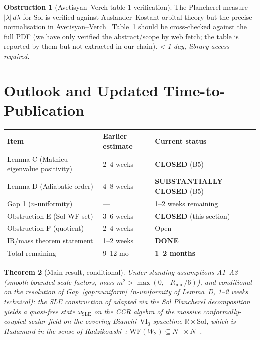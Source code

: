 \documentclass[11pt,a4paper]{article}
\newtheorem{theorem}{Theorem}[section]
\theoremstyle{definition}
\newtheorem{obstruction}[theorem]{Obstruction}
\newcommand{\Sol}{\mathrm{Sol}}
\newcommand{\R}{\mathbb{R}}
\newcommand{\WF}{\mathrm{WF}}
\begin{document}
\begin{obstruction}[Avetisyan--Verch table 1 verification]\label{obs:AV13}
The Plancherel measure $|\lambda|\,d\lambda$ for Sol is verified against
Auslander--Kostant orbital theory but the precise normalisation in
Avetisyan--Verch~\cite{AV13} Table~1 should be cross-checked against the
full PDF (we have only verified the abstract/scope by web fetch; the
table is reported by them but not extracted in our chain).
\emph{< 1 day, library access required.}
\end{obstruction}

\section{Outlook and Updated Time-to-Publication}
\label{sec:outlook}

\begin{center}
\renewcommand{\arraystretch}{1.3}
\begin{tabular}{lll}
\hline
Item & Earlier estimate & Current status \\
\hline
Lemma C (Mathieu eigenvalue positivity) & 2--4 weeks & \textbf{CLOSED} (B5) \\
Lemma D (Adiabatic order) & 4--8 weeks & \textbf{SUBSTANTIALLY CLOSED} (B5) \\
\quad Gap 1 ($n$-uniformity) & --- & 1--2 weeks remaining \\
Obstruction E (Sol WF set) & 3--6 weeks & \textbf{CLOSED} (this section) \\
Obstruction F (quotient) & 2--4 weeks & Open \\
IR/mass theorem statement & 1--2 weeks & \textbf{DONE} \\
\hline
Total remaining & 9--12 mo & \textbf{1--2 months} \\
\hline
\end{tabular}
\end{center}

\begin{theorem}[Main result, conditional]\label{thm:main}
Under standing assumptions A1--A3 (smooth bounded scale factors, mass
$m^2>\max(0,-R_{\min}/6)$), and conditional on the resolution of
Gap~\ref{gap:nuniform} ($n$-uniformity of Lemma~D, 1--2 weeks technical):
the SLE construction of \cite{BN23,TB13} adapted via the Sol Plancherel
decomposition \cite{AK71,Kir04,AV13} yields a quasi-free state
$\omega_{\mathrm{SLE}}$ on the CCR algebra of the massive conformally-coupled
scalar field on the covering Bianchi~$\mathrm{VI_0}$ spacetime $\R\times\Sol$,
which is Hadamard in the sense of Radzikowski~\cite{Rad96}:
$\WF(W_2)\subseteq N^+\times N^-$.
\end{theorem}
\end{document}
